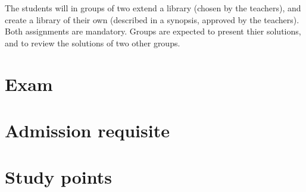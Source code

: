 \documentclass[12pt,a4paper,final]{article}
\begin{document}
The students will in groups of two extend a library (chosen by the teachers), and create a library of their own (described in a synopsis, approved by the teachers). Both assignments are mandatory. Groups are expected to present thier solutions, and to review the solutions of two other groups.

\section*{Exam}



\section*{Admission requisite}



\section*{Study points}


\end{document}
